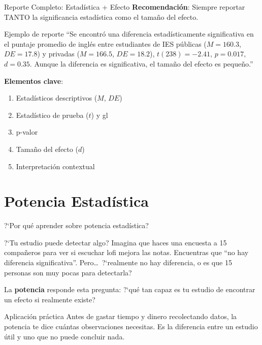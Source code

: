 \documentclass[aspectratio=169, 11pt]{beamer}
\begin{document}
\begin{frame}{Reporte Completo: Estadística + Efecto}
\textbf{Recomendación}: Siempre reportar TANTO la significancia estadística como el tamaño del efecto.

\vspace{0.3cm}
\begin{exampleblock}{Ejemplo de reporte}
``Se encontró una diferencia estadísticamente significativa en el puntaje promedio de inglés entre estudiantes de IES públicas ($M = 160.3$, $DE = 17.8$) y privadas ($M = 166.5$, $DE = 18.2$), $t(238) = -2.41$, $p = 0.017$, $d = 0.35$. Aunque la diferencia es significativa, el tamaño del efecto es pequeño.''
\end{exampleblock}

\vspace{0.3cm}
\textbf{Elementos clave}:
\begin{enumerate}
  \item Estadísticos descriptivos ($M$, $DE$)
  \item Estadístico de prueba ($t$) y gl
  \item p-valor
  \item Tamaño del efecto ($d$)
  \item Interpretación contextual
\end{enumerate}
\end{frame}

\section{Potencia Estadística}

\begin{frame}{?`Por qu\'e aprender sobre potencia estad\'istica?}
\small
\begin{exampleblock}{?`Tu estudio puede detectar algo?}
Imagina que haces una encuesta a 15 compa\~neros para ver si escuchar lofi mejora las notas. Encuentras que ``no hay diferencia significativa''. Pero\ldots\ ?`realmente no hay diferencia, o es que 15 personas son muy pocas para detectarla?
\end{exampleblock}

\vspace{0.2cm}
La \textbf{potencia} responde esta pregunta: ?`qu\'e tan capaz es tu estudio de encontrar un efecto \alert{si realmente existe}?

\vspace{0.2cm}
\begin{block}{Aplicaci\'on pr\'actica}
Antes de gastar tiempo y dinero recolectando datos, la potencia te dice cu\'antas observaciones necesitas. Es la diferencia entre un estudio \'util y uno que no puede concluir nada.
\end{block}
\end{frame}
\end{document}

